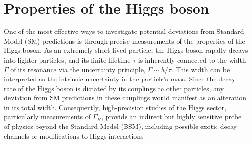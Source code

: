 
\section{Properties of the Higgs boson}



One of the most effective ways to investigate potential deviations from Standard Model (SM) predictions is through precise measurements of the properties of the Higgs boson. As an extremely short-lived particle, the Higgs boson rapidly decays into lighter particles, and its finite lifetime \( \tau \) is inherently connected to the width \( \Gamma \) of its resonance via the uncertainty principle, \( \Gamma \sim \hbar / \tau \). This width can be interpreted as the intrinsic uncertainty in the particle's mass. Since the decay rate of the Higgs boson is dictated by its couplings to other particles, any deviation from SM predictions in these couplings would manifest as an alteration in its total width. Consequently, high-precision studies of the Higgs sector, particularly measurements of \( \Gamma_H \), provide an indirect but highly sensitive probe of physics beyond the Standard Model (BSM), including possible exotic decay channels or modifications to Higgs interactions.

